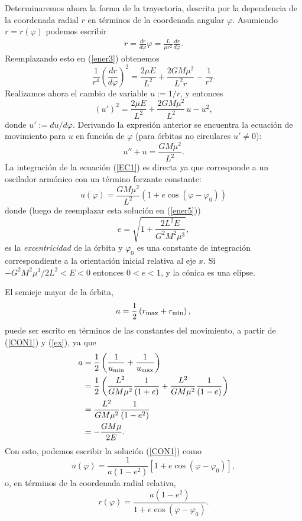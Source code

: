 Determinaremos ahora la forma de la trayectoria, descrita por la dependencia de la coordenada radial $r$ en términos de la coordenada angular $\varphi$. Asumiendo $r=r(\varphi)$ podemos escribir
\begin{eqnarray}
\dot{r}=\frac{dr}{d\varphi}\dot{\varphi}=\frac{L}{\mu r^2}\frac{dr}{d\varphi}.
\end{eqnarray}
Reemplazando esto en (\ref{ener3}) obtenemos
\begin{equation}
\frac{1}{r^4}\left(\frac{dr}{d\varphi}\right)^2=\frac{2\mu E}{L^2}+\frac{2GM\mu^2}{L^2r}-\frac{1}{r^2}.\label{ener4}
\end{equation}
Realizamos ahora el cambio de variable $u:=1/r$, y entonces
\begin{equation}
(u')^2=\frac{2\mu E}{L^2}+\frac{2GM\mu^2}{L^2}\,u-u^{2
},\label{ener5}
\end{equation}
donde $u':=du/d\varphi$. Derivando la expresión anterior se encuentra la ecuación de
movimiento para $u$ en función de $\varphi$ (para órbitas no circulares $u'\neq 0$):
\begin{equation}
u''+u=\frac{GM\mu^2}{L^2}.\label{EC1}
\end{equation}
La integración de la ecuación (\ref{EC1}) es directa ya que corresponde a un oscilador armónico con un término forzante constante:
\begin{equation}
u(\varphi)=\frac{GM\mu^2}{L^2}\left(1+e\cos
(\varphi-\varphi_0)\right)\label{CON1}
\end{equation}
donde (luego de reemplazar esta solución en (\ref{ener5}))
\begin{equation}
e=\sqrt{1+\frac{2L^2E}{G^2M^2\mu^3}}, \label{ex}
\end{equation}
es la \textit{excentricidad} de la órbita y $\varphi_0$ es una constante de
integración correspondiente a la orientación inicial relativa al eje
$x$. Si $-G^2M^2\mu^3/2L^2<E<0$ entonces $0<e<1$, y la
cónica es una elipse.

El semieje mayor de la órbita,
\begin{equation}
a=\frac{1}{2}\left(r_{\rm max}+r_{\rm min}\right),
\end{equation}
puede ser escrito en términos de las constantes del movimiento, a partir de (\ref{CON1}) y (\ref{ex}), ya que
\begin{align}
a & = \frac{1}{2}\left(\frac{1}{u_{\rm min}}+\frac{1}{u_{\rm max}}\right) \\
& = \frac{1}{2}\left(\frac{L^2}{GM\mu^2}\frac{1}{(1+e)}+\frac{L^2}{GM\mu^2}\frac{1}{(1-e)}\right) \\
& = \frac{L^2}{GM\mu^2}\frac{1}{(1-e^2)} \\
& = -\frac{GM\mu}{2E}. \label{aE}
\end{align}
Con esto, podemos escribir la solución (\ref{CON1}) como
\begin{equation}
u(\varphi)=\frac{1}{a(1-e^2)}\left[1+e\cos
(\varphi-\varphi_0)\right],
\end{equation}
o, en términos de la coordenada radial relativa,
\begin{equation}\label{rphi}
\boxed{r(\varphi)=\frac{a(1-e^2)}{1+e\cos(\varphi-\varphi_0)}.}
\end{equation}

